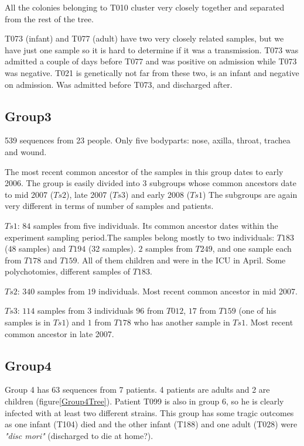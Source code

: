 \documentclass[12pt,a4paper]{article}
\begin{document}
All the colonies belonging to T010 cluster very closely together and separated from the rest of the tree.

T073 (infant) and T077 (adult) have two very closely related samples, but we have just one sample so it is hard to determine if it was a transmission. T073 was admitted a couple of days before T077 and was positive on admission while T073 was negative. T021 is genetically not far from these two, is an infant and negative on admission. Was admitted before T073, and discharged after. 

\subsection{Group3}
539 sequences from 23 people. Only five bodyparts: nose, axilla, throat, trachea and wound.

The most recent common ancestor of the samples in this group dates to early 2006. The group is easily divided into 3 subgroups whose common ancestors date to mid 2007 ($Ts2$), late 2007 ($Ts3$) and early 2008 ($Ts1$)
The subgroups are again very different in terms of number of samples and patients.

$Ts1$: $84$ samples from five individuals. Its common ancestor dates within the experiment sampling period.The samples belong mostly to two individuals: $T183$ ($48$ samples) and $T194$ (32 samples). $2$ samples from $T249$, and one sample each from $T178$ and $T159$. All of them children and were in the ICU in April. Some polychotomies, different samples of $T183$.

$Ts2$: $340$ samples from $19$ individuals. Most recent common ancestor in mid 2007.

$Ts3$: $114$ samples from 3 individuals $96$ from $T012$, $17$ from $T159$ (one of his samples is in $Ts1$) and $1$ from $T178$ who has another sample in $Ts1$. Most recent common ancestor in late 2007.


\subsection{Group4}
Group 4 has 63 sequences from 7 patients. 4 patients are adults and 2 are children (figure\ref{Group4Tree}). Patient T099 is also in group 6, so he is clearly infected with at least two different strains. This group has some tragic outcomes as one infant (T104) died and the other infant (T188) and one adult (T028) were \textit{"disc mori"} (discharged to die at home?). 
\end{document}
